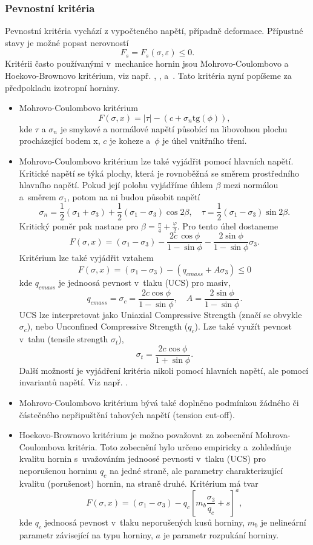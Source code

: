 \documentclass{article}
\begin{document}
\subsubsection{Pevnostní kritéria}
Pevnostní kritéria vychází z vypočteného napětí, případně deformace. Přípustné stavy je možné popsat nerovností
$$
	F_s = F_s(\sigma, \varepsilon) \leq 0.
$$
Kritérii často používanými v~mechanice hornin jsou Mohrovo-Coulombovo a Hoekovo-Brownovo kritérium, viz např. 
\cite{Desai1984}, \cite{Goel2011}, \cite{Zang2010} a~\cite{Brady2006}. Tato kritéria nyní popíšeme za předpokladu izotropní horniny.
\begin{itemize}
	\item Mohrovo-Coulombovo kritérium
		$$
			F (\sigma, x) = |\tau| - (c + \sigma_n \mbox{tg} (\phi)) ,
		$$
		kde $\tau$ a $\sigma_n$ je smykové a normálové napětí působící na libovolnou plochu procházející bodem x, $c$ je koheze a~$\phi$ je úhel vnitřního tření.
	\item Mohrovo-Coulombovo kritérium lze také vyjádřit pomocí hlavních napětí. Kritické napětí se týká plochy, která je rovnoběžná se směrem prostředního hlavního napětí. Pokud její polohu vyjádříme úhlem $\beta$ mezi normálou a~směrem $\sigma_1$, potom na ni budou působit napětí
		$$
			\sigma_n = \frac{1}{2}(\sigma_1 + \sigma_3 ) + \frac{1}{2}(\sigma_1 - \sigma_3 )\cos 2 \beta, \quad \tau = \frac{1}{2}(\sigma_1 - \sigma_3 ) \sin 2 \beta.
		$$
		Kritický poměr pak nastane pro $\beta =  \frac{\pi}{4} + \frac{\varphi}{2}$. Pro tento úhel dostaneme
		$$
			F(\sigma,x) = (\sigma_1 - \sigma_3 ) - \frac{2c\,\cos \phi}{1-\sin \phi} - \frac{2\sin \phi}{1-\sin \phi} \sigma_3 .
		$$
		Kritérium lze také vyjádřit vztahem
		$$
			F(\sigma, x) = (\sigma_1 - \sigma_3) - (q_{cmass} + A\sigma_3) \leq 0
		$$
		kde $q_{cmass}$ je jednoosá pevnost v~tlaku (UCS) pro masiv,
		$$
		q_{cmass} = \sigma_c = \frac{2c \cos \phi}{1-\sin \phi}, \quad 
		A = \frac{2 \sin \phi}{1-\sin \phi}.
		$$ 
		UCS lze interpretovat jako Uniaxial Compressive Strength (značí se obvykle $\sigma_c$), nebo Unconfined Compressive Strength ($q_c$). Lze také využít pevnost v~tahu (tensile strength $\sigma_t$),
		$$
             \sigma_t = \frac{2c \cos \phi}{1+ \sin \phi}.
		$$
		Další možností je vyjádření kritéria nikoli pomocí hlavních napětí, ale pomocí invariantů napětí. Viz např. \cite{Desai1984}.
	\item Mohrovo-Coulombovo kritérium bývá také doplněno podmínkou žádného či částečného nepřipuštění tahových napětí (tension cut-off).
	\item Hoekovo-Brownovo kritérium je možno považovat za zobecnění Mohrova-Coulombova kritéria. Toto zobecnění bylo určeno empiricky a~zohledňuje kvalitu hornin s~uvažováním jednoosé pevnosti v~tlaku (UCS) pro neporušenou horninu $q_c$ na jedné straně, ale parametry charakterizující kvalitu (porušenost) hornin, na straně druhé. 					Kritérium má tvar
		$$
			F(\sigma,x)=(\sigma_1 - \sigma_3 ) - q_c \left[m_b \frac{\sigma_3}{q_c} + s \right]^a ,
		$$
		kde $q_{c}$ jednoosá pevnost v~tlaku neporušených kusů horniny, $m_b$ je nelineární parametr závisející na typu horniny, $a$ je parametr rozpukání horniny.
\end{itemize}
\end{document}
